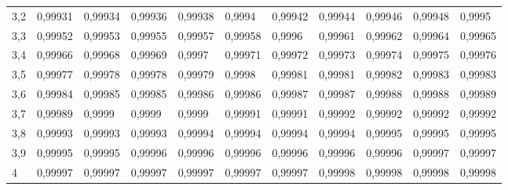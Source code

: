 \documentclass[addpoints,spanish, 12pt,a4paper]{exam}
\begin{document}
\begin{table}
\begin{tabular}{l|llllllllll}
3,2 & 0,99931 & 0,99934 & 0,99936 & 0,99938 & 0,9994  & 0,99942 & 0,99944 & 0,99946 & 0,99948 & 0,9995  \\
3,3 & 0,99952 & 0,99953 & 0,99955 & 0,99957 & 0,99958 & 0,9996  & 0,99961 & 0,99962 & 0,99964 & 0,99965 \\
3,4 & 0,99966 & 0,99968 & 0,99969 & 0,9997  & 0,99971 & 0,99972 & 0,99973 & 0,99974 & 0,99975 & 0,99976 \\
3,5 & 0,99977 & 0,99978 & 0,99978 & 0,99979 & 0,9998  & 0,99981 & 0,99981 & 0,99982 & 0,99983 & 0,99983 \\
3,6 & 0,99984 & 0,99985 & 0,99985 & 0,99986 & 0,99986 & 0,99987 & 0,99987 & 0,99988 & 0,99988 & 0,99989 \\
3,7 & 0,99989 & 0,9999  & 0,9999  & 0,9999  & 0,99991 & 0,99991 & 0,99992 & 0,99992 & 0,99992 & 0,99992 \\
3,8 & 0,99993 & 0,99993 & 0,99993 & 0,99994 & 0,99994 & 0,99994 & 0,99994 & 0,99995 & 0,99995 & 0,99995 \\
3,9 & 0,99995 & 0,99995 & 0,99996 & 0,99996 & 0,99996 & 0,99996 & 0,99996 & 0,99996 & 0,99997 & 0,99997 \\
4   & 0,99997 & 0,99997 & 0,99997 & 0,99997 & 0,99997 & 0,99997 & 0,99998 & 0,99998 & 0,99998 & 0,99998
\end{tabular}
\end{table}
\restoregeometry
\end{document}
